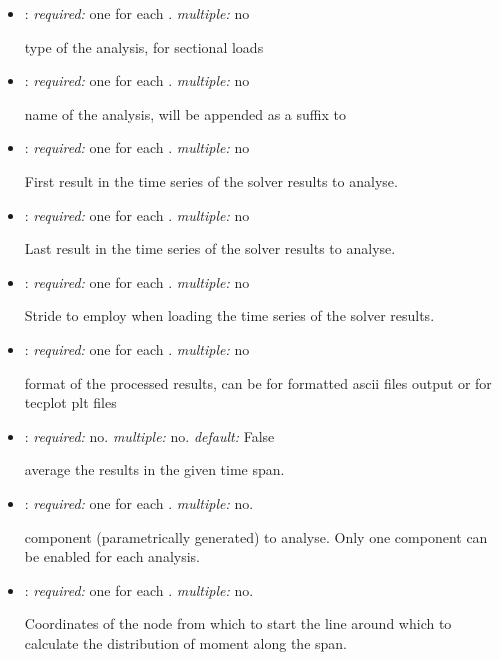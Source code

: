 \begin{itemize}
\item {}: \textit{required:} one for each . \textit{multiple:} no

type of the analysis,  for sectional loads

\item {}: \textit{required:} one for each . \textit{multiple:} no

name of the analysis, will be appended as a suffix to 

\item {}: \textit{required:} one for each . 
\textit{multiple:} no

First result in the time series of the solver results to analyse.

\item {}: \textit{required:} one for each . 
\textit{multiple:} no

Last result in the time series of the solver results to analyse.

\item {}: \textit{required:} one for each . 
\textit{multiple:} no

Stride to employ when loading the time series of the solver results. 

\item {}: \textit{required:} one for each . 
\textit{multiple:} no

format of the processed results, can be  for formatted ascii files 
output or  for tecplot plt files

\item {}: \textit{required:} no. \textit{multiple:} no. 
\textit{default:} False

average the results in the given time span.

\item {}: \textit{required:} one for each . 
\textit{multiple:} no.

component (parametrically generated) to analyse. Only one component can be 
enabled for each analysis. 

\item {}: \textit{required:} one for each . 
\textit{multiple:} no.

Coordinates of the node from which to start the line around which to calculate 
the distribution of moment along the span.


\end{itemize}
